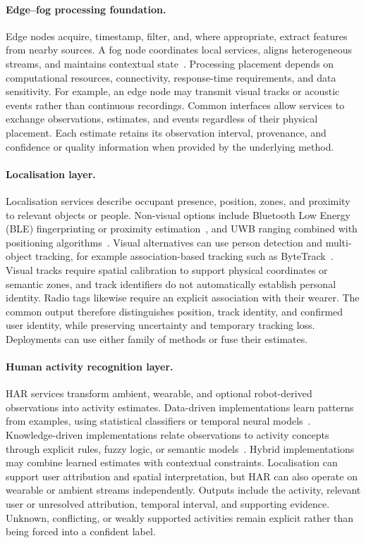 \documentclass[10pt,twocolumn]{article}
\begin{document}
\paragraph{Edge--fog processing foundation.}
Edge nodes acquire, timestamp, filter, and, where appropriate, extract features from nearby sources. A fog node coordinates local services, aligns heterogeneous streams, and maintains contextual state~\cite{shi2016edge}. Processing placement depends on computational resources, connectivity, response-time requirements, and data sensitivity. For example, an edge node may transmit visual tracks or acoustic events rather than continuous recordings. Common interfaces allow services to exchange observations, estimates, and events regardless of their physical placement. Each estimate retains its observation interval, provenance, and confidence or quality information when provided by the underlying method.

\paragraph{Localisation layer.}
Localisation services describe occupant presence, position, zones, and proximity to relevant objects or people. Non-visual options include Bluetooth Low Energy (BLE) fingerprinting or proximity estimation~\cite{faragher2015ble}, and UWB ranging combined with positioning algorithms~\cite{dardari2009ranging}. Visual alternatives can use person detection and multi-object tracking, for example association-based tracking such as ByteTrack~\cite{zhang2022bytetrack}. Visual tracks require spatial calibration to support physical coordinates or semantic zones, and track identifiers do not automatically establish personal identity. Radio tags likewise require an explicit association with their wearer. The common output therefore distinguishes position, track identity, and confirmed user identity, while preserving uncertainty and temporary tracking loss. Deployments can use either family of methods or fuse their estimates.

\paragraph{Human activity recognition layer.}
HAR services transform ambient, wearable, and optional robot-derived observations into activity estimates. Data-driven implementations learn patterns from examples, using statistical classifiers or temporal neural models~\cite{ordonez2016deep}. Knowledge-driven implementations relate observations to activity concepts through explicit rules, fuzzy logic, or semantic models~\cite{polo2025health}. Hybrid implementations may combine learned estimates with contextual constraints. Localisation can support user attribution and spatial interpretation, but HAR can also operate on wearable or ambient streams independently. Outputs include the activity, relevant user or unresolved attribution, temporal interval, and supporting evidence. Unknown, conflicting, or weakly supported activities remain explicit rather than being forced into a confident label.
\end{document}
